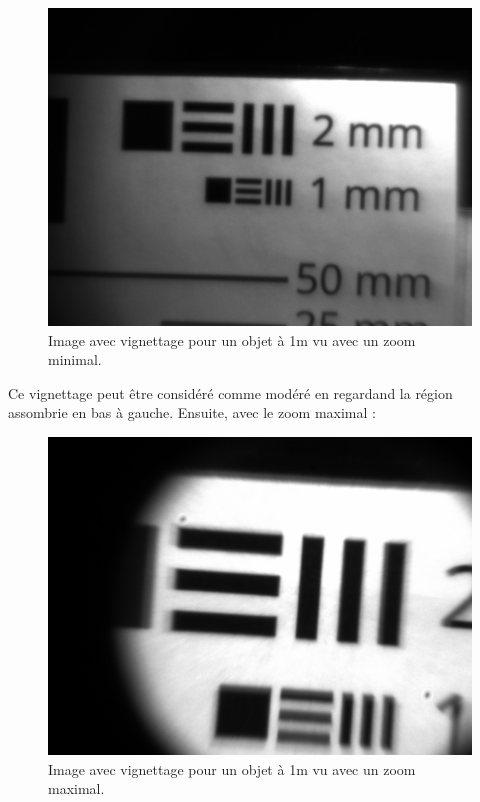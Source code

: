 \documentclass[11pt,letterpaper]{article}
\begin{document}
\begin{figure}[H]
  \centering
  \includegraphics[scale=0.3]{vig_1m_min.png}
  \caption{Image avec vignettage pour un objet à 1m vu avec un zoom minimal.}
  \label{vig_m_min}
\end{figure}

Ce vignettage peut être considéré comme modéré en regardand la région assombrie en 
bas à gauche. Ensuite, avec le zoom maximal :

\begin{figure}[H]
  \centering
  \includegraphics[scale=0.3]{vig_1m_max.png}
  \caption{Image avec vignettage pour un objet à 1m vu avec un zoom maximal.}
  \label{vig_m_max}
\end{figure}
\end{document}
